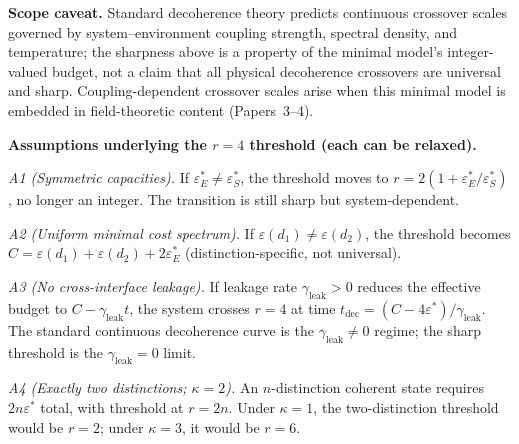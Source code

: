 \documentclass[11pt]{article}
\theoremstyle{remark}
\begin{document}
\medskip\noindent\textbf{Scope caveat.}  Standard decoherence theory predicts continuous crossover scales governed by system--environment coupling strength, spectral density, and temperature; the sharpness above is a property of the minimal model's integer-valued budget, not a claim that all physical decoherence crossovers are universal and sharp.  Coupling-dependent crossover scales arise when this minimal model is embedded in field-theoretic content (Papers~3--4).

\medskip\noindent\textbf{Assumptions underlying the $r = 4$ threshold (each can be relaxed).}

\textit{A1 (Symmetric capacities).}  If $\varepsilon^*_E \ne \varepsilon^*_S$, the threshold moves to $r = 2(1 + \varepsilon^*_E/\varepsilon^*_S)$, no longer an integer.  The transition is still sharp but system-dependent.

\textit{A2 (Uniform minimal cost spectrum).}  If $\varepsilon(d_1) \ne \varepsilon(d_2)$, the threshold becomes $C = \varepsilon(d_1) + \varepsilon(d_2) + 2\varepsilon^*_E$ (distinction-specific, not universal).

\textit{A3 (No cross-interface leakage).}  If leakage rate $\gamma_{\mathrm{leak}} > 0$ reduces the effective budget to $C - \gamma_{\mathrm{leak}} t$, the system crosses $r = 4$ at time $t_{\mathrm{dec}} = (C - 4\varepsilon^*)/\gamma_{\mathrm{leak}}$.  The standard continuous decoherence curve is the $\gamma_{\mathrm{leak}} \ne 0$ regime; the sharp threshold is the $\gamma_{\mathrm{leak}} = 0$ limit.

\textit{A4 (Exactly two distinctions; $\kappa = 2$).}  An $n$-distinction coherent state requires $2n\varepsilon^*$ total, with threshold at $r = 2n$.  Under $\kappa = 1$, the two-distinction threshold would be $r = 2$; under $\kappa = 3$, it would be $r = 6$.
\end{document}
